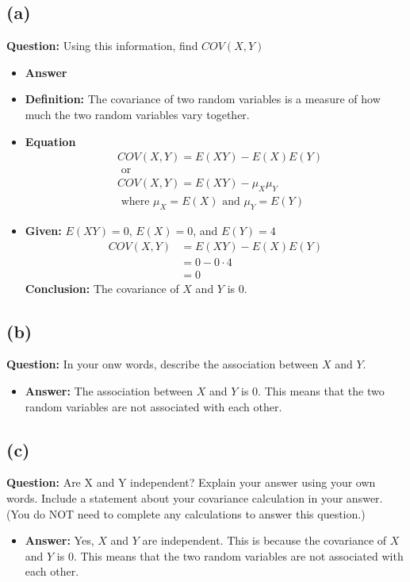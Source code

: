 \documentclass{article}
\begin{document}
\subsection*{(a)}
\textbf{Question:} Using this information, find $COV(X, Y)$
\begin{itemize}
    \item[] \textbf{Answer} 
    \item \textbf{Definition:} The covariance of two random variables is a measure of how much the two random variables vary together. 
    \item \textbf{Equation}
    \begin{equation*}
        \begin{aligned}
        &COV(X, Y) = E(XY) - E(X)E(Y) \\
        &\text{ or } \\
        &COV(X, Y) = E(XY) - \mu_X \mu_Y \\
        &\text{ where } \mu_X = E(X) \text{ and } \mu_Y = E(Y)
        \end{aligned}
        \end{equation*}
    \item \textbf{Given:} $E(XY) = 0$, $E(X) = 0$, and $E(Y) = 4$
    \begin{align*}
        COV(X, Y) &= E(XY) - E(X)E(Y)\\
        &= 0 - 0 \cdot 4\\
        &= 0
    \end{align*}
    \textbf{Conclusion:} The covariance of $X$ and $Y$ is 0.
\end{itemize}

\subsection*{(b)}
\textbf{Question:} In your onw words, describe the association between $X$ and $Y$.
\begin{itemize}
    \item[] \textbf{Answer: } The association between $X$ and $Y$ is 0. This means that the two random variables are not associated with each other.
\end{itemize}

\subsection*{(c)} \textbf{Question:} Are X and Y independent? Explain your answer using your own words. Include a
statement about your covariance calculation in your answer. (You do NOT need to
complete any calculations to answer this question.)
\begin{itemize}
    \item[] \textbf{Answer: } Yes, $X$ and $Y$ are independent. This is because the covariance of $X$ and $Y$ is 0. This means that the two random variables are not associated with each other.
\end{itemize}   
\end{document}

